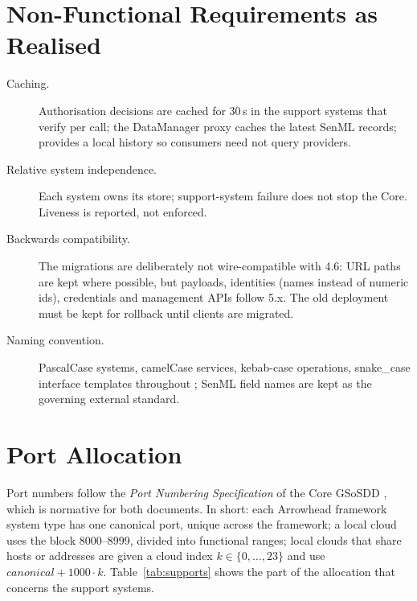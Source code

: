 \documentclass[a4paper]{arrowhead}
\newcommand{\sys}[1]{\textcolor{ArrowheadBlue}{\textbf{\ahbreak{#1}}}}      %
\begin{document}
\section{Non-Functional Requirements as Realised}
\label{sec:nfr}

\begin{description}
  \item[Caching.] Authorisation decisions are cached for 30\,s in the support systems that
        verify per call; the DataManager proxy caches the latest SenML records;
        \sys{SysMonitor} provides a local history so consumers need not query providers.
  \item[Relative system independence.] Each system owns its store; support-system failure does
        not stop the Core. Liveness is reported, not enforced.
  \item[Backwards compatibility.] The migrations are deliberately not wire-compatible with 4.6:
        URL paths are kept where possible, but payloads, identities (names instead of numeric
        ids), credentials and management APIs follow 5.x. The old deployment must be kept for
        rollback until clients are migrated.
  \item[Naming convention.] PascalCase systems, camelCase services, kebab-case operations,
        snake\_case interface templates throughout \cite{naming2}; SenML field names are kept as
        the governing external standard.
\end{description}

\section{Port Allocation}
\label{sec:ports}

Port numbers follow the \emph{Port Numbering Specification} of the Core GSoSDD
\cite{gsosddcore}, which is normative for both documents. In short: each Arrowhead framework
system type has one canonical port, unique across the framework; a local cloud uses the block
8000--8999, divided into functional ranges; local clouds that share hosts or addresses are
given a cloud index $k \in \{0,\dots,23\}$ and use $\mathit{canonical}+1000\cdot k$.
Table~\ref{tab:supports} shows the part of the allocation that concerns the support systems.
\end{document}
